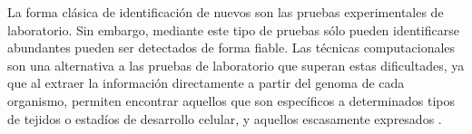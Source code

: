 La forma clásica de identificación de nuevos  son las
pruebas experimentales de laboratorio.
Sin embargo, mediante este tipo de pruebas sólo pueden identificarse
 abundantes pueden ser detectados de forma fiable.
Las técnicas computacionales son una alternativa a las pruebas de
laboratorio que superan estas dificultades, ya que al extraer la
información directamente a partir del genoma de cada organismo,
permiten encontrar aquellos  que son específicos a
determinados tipos de tejidos o estadíos de desarrollo celular, y
aquellos escasamente expresados \cite{ding,sheng,xu}.
